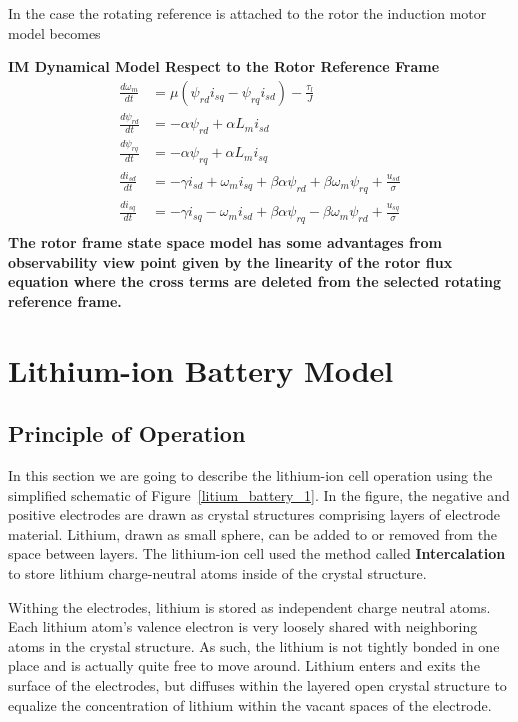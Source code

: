 \documentclass[12pt,a4paper,oneside]{book}
\begin{document}
\begin{onehalfspace}
In the case the rotating reference is attached to the rotor the induction motor 
model becomes
\begin{mybox}
	\textbf{IM Dynamical Model Respect to the Rotor Reference Frame}
	\begin{equation}\label{im_eq_43}
		\begin{aligned}
			\frac{d\omega_m}{dt} &= \mu \left(\psi_{rd}i_{sq} - 
			\psi_{rq}i_{sd}\right)-\frac{\tau_l}{J} \\[6pt]
			\frac{d\psi_{rd}}{dt} &= -\alpha \psi_{rd} + \alpha L_m i_{sd} 
			\\[6pt]
			\frac{d\psi_{rq}}{dt} &= -\alpha \psi_{rq} + \alpha L_m i_{sq} 
			\\[6pt]
			\frac{di_{sd}}{dt} &= -\gamma i_{sd}  + \omega_m i_{sq} + 
			\beta\alpha\psi_{rd}+\beta\omega_m\psi_{rq} + \frac{u_{sd}}{\sigma} 
			\\[6pt]
			\frac{di_{sq}}{dt} &= -\gamma i_{sq}  - \omega_m i_{sd} + 
			\beta\alpha\psi_{rq}-\beta\omega_m\psi_{rd} + \frac{u_{sq}}{\sigma} 
			\\[6pt]
		\end{aligned}
	\end{equation}
	\textbf{The rotor frame state space model has some advantages from 
		observability view point given by the linearity of the rotor flux 
		equation 
		where the cross terms are deleted from the selected rotating reference 
		frame.}
\end{mybox}

\section{Lithium-ion Battery Model}
\subsection{Principle of Operation}
In this section we are going to describe the lithium-ion cell operation using the simplified schematic of Figure~\ref{litium_battery_1}. In the figure, the negative and positive electrodes are drawn as crystal structures comprising layers of electrode material. Lithium, drawn as small sphere, can be added to or removed from the space between layers. The lithium-ion cell used the method called \textbf{Intercalation} to store lithium charge-neutral atoms inside of the crystal structure.

Withing the electrodes, lithium is stored as independent charge neutral atoms. Each lithium atom's valence electron is very loosely shared with neighboring atoms in the crystal structure. As such, the lithium is not tightly bonded in one place and is actually quite free to move around. Lithium enters and exits the surface of the electrodes, but diffuses within the layered open crystal structure to equalize the concentration of lithium within the vacant spaces of the electrode.


\end{onehalfspace}
\end{document}
